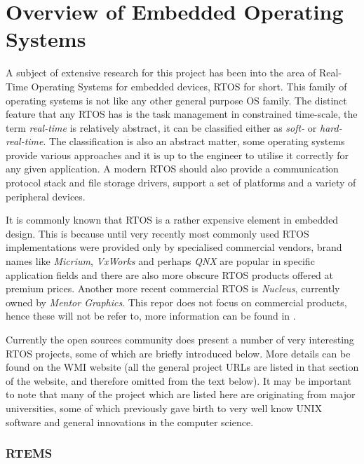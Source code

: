 \section{Overview of Embedded Operating Systems} \label{sec:RTOS}


   A subject of extensive research for this project has been into the
  area of Real-Time Operating Systems for embedded devices, RTOS for short.
  This family of operating systems is not like any other general
  purpose OS family. The distinct feature that any RTOS has is the task
  management in constrained time-scale, the term \emph{real-time} is relatively
  abstract, it can be classified either as \emph{soft-} or \emph{hard-real-time}.
  The classification is also an abstract matter, some operating systems provide
  various approaches and it is up to the engineer to utilise it correctly for
  any given application. A modern RTOS should also provide a communication
  protocol stack and file storage drivers, support a set of platforms and
  a variety of peripheral devices.
 
 It is commonly known that RTOS is a rather expensive element in embedded design.
 This is because until very recently most commonly used RTOS implementations were
 provided only by specialised commercial vendors, brand names like \emph{Micrium},
 \emph{VxWorks} and perhaps \emph{QNX} are popular in specific application fields
 and there are also more obscure RTOS products offered at premium prices. Another
 more recent commercial RTOS is \emph{Nucleus}, currently owned by \emph{Mentor
 Graphics}. This repor does not focus on commercial products, hence these will
 not be refer to, more information can be found in \cite{links:wiki:rtos,
 links:wiki:rtos:list}.


 Currently the open sources community does present a number of very interesting
 RTOS projects, some of which are briefly introduced below. More details can be
 found on the WMI website \cite{wmi:wiki:rtos} (all the general project URLs are
 listed in that section of the website, and therefore omitted from the text below).
 It may be important to note that many of the project which are listed here are
 originating from major universities, some of which previously gave birth to very
 well know UNIX software and general innovations in the computer science.


 \subsubsection{RTEMS} \label{sec:rtos:rtems}

